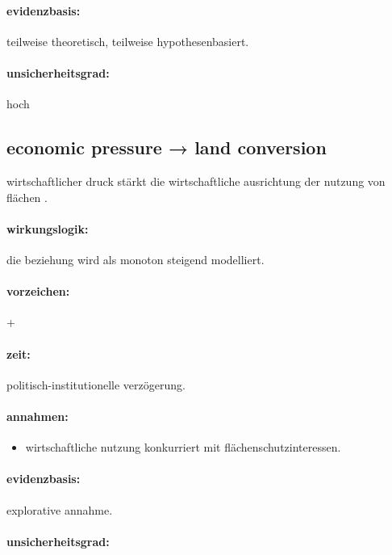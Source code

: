 \documentclass[11pt, a4paper, oneside]{scrartcl}
\begin{document}
\paragraph{evidenzbasis:}

teilweise theoretisch, teilweise hypothesenbasiert.

\paragraph{unsicherheitsgrad:} 

hoch

\subsection{economic pressure → land conversion}
wirtschaftlicher druck stärkt die wirtschaftliche ausrichtung der nutzung von flächen .

\paragraph{wirkungslogik:}

die beziehung wird als monoton steigend modelliert.

\paragraph{vorzeichen:}

+

\paragraph{zeit:} 

politisch-institutionelle verzögerung.

\paragraph{annahmen:}
\begin{itemize}
\item wirtschaftliche nutzung konkurriert mit flächenschutzinteressen.
\end{itemize}

\paragraph{evidenzbasis:}

explorative annahme.

\paragraph{unsicherheitsgrad:} 
\end{document}
